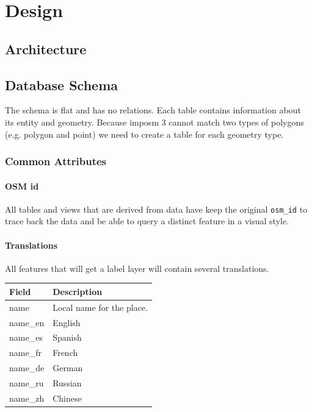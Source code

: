 \chapter{Design}\label{design}


\section{Architecture}\label{architecture}



\section{Database Schema}\label{database-schema}


The schema is flat and has no relations. Each table contains
information about its entity and geometry. Because imposm 3
cannot match two types of polygons (e.g. polygon and point) we need
to create a table for each geometry type.


\subsection{Common Attributes}

\subsubsection{OSM id}

All tables and views that are derived from \osm{} data have keep the original \texttt{osm\_id}
to trace back the data and be able to query a distinct \osm{} feature in a visual style.

\subsubsection{Translations}

All features that will get a label layer will contain several translations.

\begin{flushleft}
\begin{table}
    \begin{tabular}{ll}
    \hline
     Field    & 	Description                                    \\
    \hline
    name      & Local name for the place.  \\
    name\_en	 & English                          \\
    name\_es	 & Spanish                          \\
    name\_fr	 & French                           \\
    name\_de	 & German                           \\
    name\_ru	 & Russian                          \\
    name\_zh	 & Chinese                          \\
    \end{tabular}
\end{table}
\end{flushleft}


